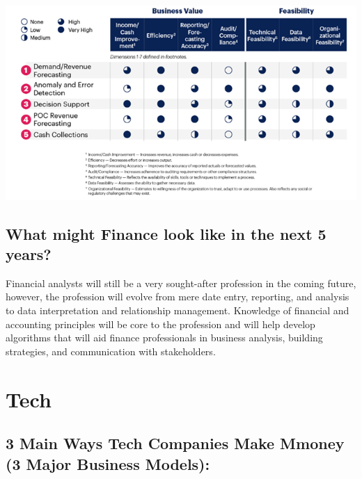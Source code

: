 \documentclass[
]{article}
\begin{document}
\includegraphics{financeaiusecases.jpg}

\hypertarget{what-might-finance-look-like-in-the-next-5-years}{%
\subsection{What might Finance look like in the next 5 years?}\label{what-might-finance-look-like-in-the-next-5-years}}

Financial analysts will still be a very sought-after profession in the coming future, however, the profession will evolve from mere date entry, reporting, and analysis to data interpretation and relationship management. Knowledge of financial and accounting principles will be core to the profession and will help develop algorithms that will aid finance professionals in business analysis, building strategies, and communication with stakeholders.

\hypertarget{tech}{%
\section{Tech}\label{tech}}

\hypertarget{main-ways-tech-companies-make-mmoney-3-major-business-models}{%
\subsection{3 Main Ways Tech Companies Make Mmoney (3 Major Business Models):}\label{main-ways-tech-companies-make-mmoney-3-major-business-models}}
\end{document}
